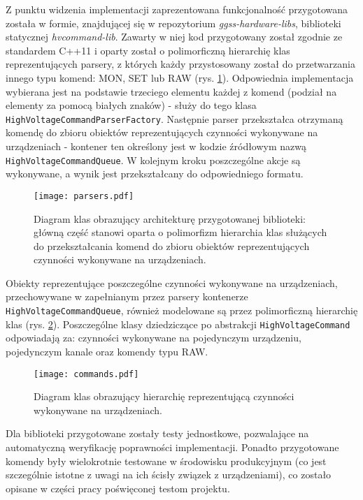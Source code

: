 Z punktu widzenia implementacji zaprezentowana funkcjonalność przygotowana została w formie, znajdującej się w repozytorium \emph{ggss-hardware-libs}, biblioteki statycznej \emph{hvcommand-lib}. Zawarty w niej kod przygotowany został zgodnie ze standardem C++11 i oparty został o polimorficzną hierarchię klas reprezentujących parsery, z których każdy przystosowany został do przetwarzania innego typu komend: MON, SET lub RAW (rys. \ref{fig:psu_parsers}). Odpowiednia implementacja wybierana jest na podstawie trzeciego elementu każdej z komend (podział na elementy za pomocą białych znaków) - służy do tego klasa \lstinline{HighVoltageCommandParserFactory}. Następnie parser przekształca otrzymaną komendę do zbioru obiektów reprezentujących czynności wykonywane na urządzeniach - kontener ten określony jest w kodzie źródłowym nazwą \lstinline{HighVoltageCommandQueue}. W kolejnym kroku poszczególne akcje są wykonywane, a wynik jest przekształcany do odpowiedniego formatu.

\begin{figure}[H]
\centering
\texttt{[image: parsers.pdf]}
\caption{Diagram klas obrazujący architekturę przygotowanej biblioteki: główną część stanowi oparta o polimorfizm hierarchia klas służących do przekształcania komend do zbioru obiektów reprezentujących czynności wykonywane na urządzeniach. }
\label{fig:psu_parsers}
\end{figure}

Obiekty reprezentujące poszczególne czynności wykonywane na urządzeniach, przechowywane w zapełnianym przez parsery kontenerze \lstinline{HighVoltageCommandQueue}, również modelowane są przez polimorficzną hierarchię klas (rys. \ref{fig:psu_commands}). Poszczególne klasy dziedziczące po abstrakcji \lstinline{HighVoltageCommand} odpowiadają za: czynności wykonywane na pojedynczym urządzeniu, pojedynczym kanale oraz komendy typu RAW.

\begin{figure}[H]
\centering
\texttt{[image: commands.pdf]}
\caption{Diagram klas obrazujący hierarchię reprezentującą czynności wykonywane na urządzeniach.}
\label{fig:psu_commands}
\end{figure}

Dla biblioteki przygotowane zostały testy jednostkowe, pozwalające na automatyczną weryfikację poprawności implementacji. Ponadto przygotowane komendy były wielokrotnie testowane w środowisku produkcyjnym (co jest szczególnie istotne z uwagi na ich ścisły związek z urządzeniami), co zostało opisane w części pracy poświęconej testom projektu.

